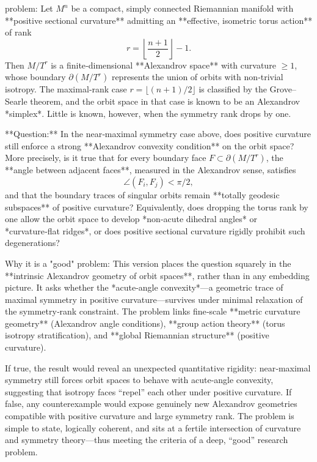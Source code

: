 problem:  
Let \( M^n \) be a compact, simply connected Riemannian manifold with **positive sectional curvature** admitting an **effective, isometric torus action** of rank  
\[
r = \left\lfloor \frac{n+1}{2}\right\rfloor - 1.
\]  
Then \(M/T^r\) is a finite‑dimensional **Alexandrov space** with curvature \(\ge 1\), whose boundary \(\partial(M/T^r)\) represents the union of orbits with non‑trivial isotropy.  The maximal‑rank case \(r = \lfloor (n+1)/2 \rfloor\) is classified by the Grove–Searle theorem, and the orbit space in that case is known to be an Alexandrov *simplex*.  Little is known, however, when the symmetry rank drops by one.  

**Question:**  
In the near‑maximal symmetry case above, does positive curvature still enforce a strong **Alexandrov convexity condition** on the orbit space?  More precisely, is it true that for every boundary face \(F \subset \partial(M/T^r)\), the **angle between adjacent faces**, measured in the Alexandrov sense, satisfies  
\[
\angle(F_i,F_j) < \pi/2,
\]  
and that the boundary traces of singular orbits remain **totally geodesic subspaces** of positive curvature?  
Equivalently, does dropping the torus rank by one allow the orbit space to develop *non‑acute dihedral angles* or *curvature‑flat ridges*, or does positive sectional curvature rigidly prohibit such degenerations?  

Why it is a "good" problem:  
This version places the question squarely in the **intrinsic Alexandrov geometry of orbit spaces**, rather than in any embedding picture.  It asks whether the *acute‑angle convexity*—a geometric trace of maximal symmetry in positive curvature—survives under minimal relaxation of the symmetry‑rank constraint.  The problem links fine‑scale **metric curvature geometry** (Alexandrov angle conditions), **group action theory** (torus isotropy stratification), and **global Riemannian structure** (positive curvature).  

If true, the result would reveal an unexpected quantitative rigidity: near‑maximal symmetry still forces orbit spaces to behave with acute‑angle convexity, suggesting that isotropy faces “repel” each other under positive curvature.  If false, any counterexample would expose genuinely new Alexandrov geometries compatible with positive curvature and large symmetry rank.  The problem is simple to state, logically coherent, and sits at a fertile intersection of curvature and symmetry theory—thus meeting the criteria of a deep, “good” research problem.